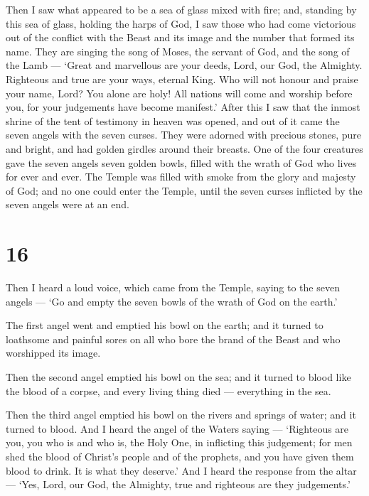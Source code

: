  Then I saw what appeared to be a sea of glass mixed with
fire; and, standing by this sea of glass, holding the harps of God, I
saw those who had come victorious out of the conflict with the Beast and
its image and the number that formed its name.  They are
singing the song of Moses, the servant of God, and the song of the Lamb
--- `Great and marvellous are your deeds, Lord, our God, the Almighty.
Righteous and true are your ways, eternal King.  Who will
not honour and praise your name, Lord? You alone are holy! All nations
will come and worship before you, for your judgements have become
manifest.'  After this I saw that the inmost shrine of the
tent of testimony in heaven was opened,  and out of it came
the seven angels with the seven curses. They were adorned with precious
stones, pure and bright, and had golden girdles around their breasts.
 One of the four creatures gave the seven angels seven
golden bowls, filled with the wrath of God who lives for ever and ever.
 The Temple was filled with smoke from the glory and majesty
of God; and no one could enter the Temple, until the seven curses
inflicted by the seven angels were at an end.

\hypertarget{section-15}{%
\section{16}\label{section-15}}

 Then I heard a loud voice, which came from the Temple,
saying to the seven angels --- `Go and empty the seven bowls of the
wrath of God on the earth.'

 The first angel went and emptied his bowl on the earth; and
it turned to loathsome and painful sores on all who bore the brand of
the Beast and who worshipped its image.

 Then the second angel emptied his bowl on the sea; and it
turned to blood like the blood of a corpse, and every living thing died
--- everything in the sea.

 Then the third angel emptied his bowl on the rivers and
springs of water; and it turned to blood.  And I heard the
angel of the Waters saying --- `Righteous are you, you who is and who
is, the Holy One, in inflicting this judgement;  for men
shed the blood of Christ's people and of the prophets, and you have
given them blood to drink. It is what they deserve.'  And I
heard the response from the altar --- `Yes, Lord, our God, the Almighty,
true and righteous are they judgements.'

